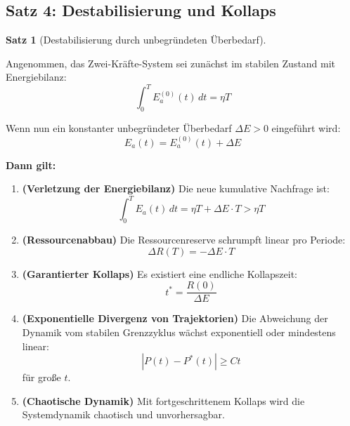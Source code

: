 \documentclass[a4paper, 12pt, twoside, openright]{report}
\theoremstyle{definition}
\theoremstyle{definition}
\newtheorem{satz}{Satz}[chapter]
\begin{document}
\subsection{Satz 4: Destabilisierung und Kollaps}

\begin{satz}[Destabilisierung durch unbegründeten Überbedarf]\label{satz:destabilisierung}
    
    Angenommen, das Zwei-Kräfte-System sei zunächst im stabilen Zustand mit Energiebilanz:
    \begin{equation}
        \int_0^T E_a^{(0)}(t) \, dt = \eta T
    \end{equation}
    
    Wenn nun ein konstanter unbegründeter Überbedarf $\Delta E > 0$ eingeführt wird:
    \begin{equation}
        E_a(t) = E_a^{(0)}(t) + \Delta E
    \end{equation}
    
    \textbf{Dann gilt:}
    
    \begin{enumerate}
        \item \textbf{(Verletzung der Energiebilanz)} Die neue kumulative Nachfrage ist:
        \begin{equation}
            \int_0^T E_a(t) \, dt = \eta T + \Delta E \cdot T > \eta T
        \end{equation}
        
        \item \textbf{(Ressourcenabbau)} Die Ressourcenreserve schrumpft linear pro Periode:
        \begin{equation}
            \Delta R(T) = -\Delta E \cdot T
        \end{equation}
        
        \item \textbf{(Garantierter Kollaps)} Es existiert eine endliche Kollapszeit:
        \begin{equation}
            \boxed{t^* = \frac{R(0)}{\Delta E}}
        \end{equation}
        
        \item \textbf{(Exponentielle Divergenz von Trajektorien)} Die Abweichung der Dynamik vom stabilen Grenzzyklus wächst exponentiell oder mindestens linear:
        \begin{equation}
            |P(t) - P^*(t)| \geq Ct
        \end{equation}
        für große $t$.
        
        \item \textbf{(Chaotische Dynamik)} Mit fortgeschrittenem Kollaps wird die Systemdynamik chaotisch und unvorhersagbar.
    \end{enumerate}
\end{satz}
\end{document}
